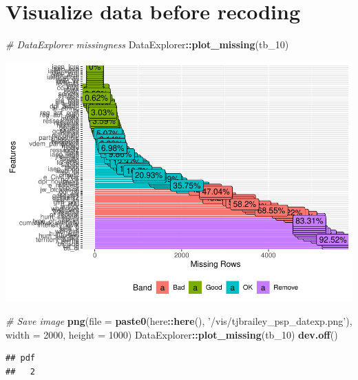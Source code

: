 \documentclass[
]{article}
\newenvironment{Shaded}{\begin{snugshade}}{\end{snugshade}}
\newcommand{\CommentTok}[1]{\textcolor[rgb]{0.56,0.35,0.01}{\textit{#1}}}
\newcommand{\DataTypeTok}[1]{\textcolor[rgb]{0.13,0.29,0.53}{#1}}
\newcommand{\DecValTok}[1]{\textcolor[rgb]{0.00,0.00,0.81}{#1}}
\newcommand{\KeywordTok}[1]{\textcolor[rgb]{0.13,0.29,0.53}{\textbf{#1}}}
\newcommand{\NormalTok}[1]{#1}
\newcommand{\OperatorTok}[1]{\textcolor[rgb]{0.81,0.36,0.00}{\textbf{#1}}}
\newcommand{\StringTok}[1]{\textcolor[rgb]{0.31,0.60,0.02}{#1}}
\begin{document}
\hypertarget{visualize-data-before-recoding}{%
\section{Visualize data before
recoding}\label{visualize-data-before-recoding}}

\begin{Shaded}
\begin{Highlighting}[]
\CommentTok{# DataExplorer missingness}
\NormalTok{DataExplorer}\OperatorTok{::}\KeywordTok{plot_missing}\NormalTok{(tb_}\DecValTok{10}\NormalTok{)}
\end{Highlighting}
\end{Shaded}

\includegraphics{01_tjbrailey_wrangle_data_files/figure-latex/unnamed-chunk-12-1.pdf}

\begin{Shaded}
\begin{Highlighting}[]
\CommentTok{# Save image}
\KeywordTok{png}\NormalTok{(}\DataTypeTok{file =} \KeywordTok{paste0}\NormalTok{(here}\OperatorTok{::}\KeywordTok{here}\NormalTok{(), }\StringTok{'/vis/tjbrailey_psp_datexp.png'}\NormalTok{),}
    \DataTypeTok{width =} \DecValTok{2000}\NormalTok{,}
    \DataTypeTok{height =} \DecValTok{1000}\NormalTok{)}
\NormalTok{DataExplorer}\OperatorTok{::}\KeywordTok{plot_missing}\NormalTok{(tb_}\DecValTok{10}\NormalTok{)}
\KeywordTok{dev.off}\NormalTok{()}
\end{Highlighting}
\end{Shaded}

\begin{verbatim}
## pdf 
##   2
\end{verbatim}
\end{document}
